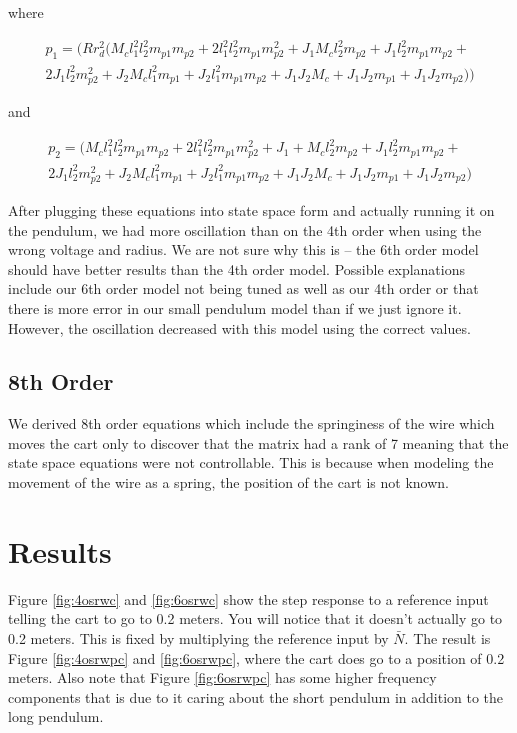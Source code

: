 \documentclass{article}
\begin{document}
where 

\begin{multline} 
\label{p1}
p_1 = (R r_d^2 (M_c l_1^2 l_2^2 m_{p1} m_{p2}+2 l_1^2 l_2^2 m_{p1} m_{p2}^2+J_1 M_c l_2^2 m_{p2}+J_1 l_2^2 m_{p1} m_{p2}+\\2 J_1 l_2^2 m_{p2}^2+J_2 M_c l_1^2 m_{p1}+J_2 l_1^2 m_{p1} m_{p2}+J_1 J_2 M_c+J_1 J_2 m_{p1}+J_1 J_2 m_{p2}))
\end{multline}

and 

\begin{multline*} 
\label{p2}
 p_2 = (M_c l_1^2 l_2^2 m_{p1}m_{p2}+2 l_1^2 l_2^2 m_{p1} m_{p2}^2+J_1+M_c l_2^2 m_{p2}+J_1 l_2^2 m_{p1} m_{p2}+\\2 J_1 l_2^2 m_{p2}^2+J_2 M_c l_1^2 m_{p1}+J_2 l_1^2 m_{p1} m_{p2}+J_1 J_2 M_c+J_1 J_2 m_{p1}+J_1 J_2 m_{p2})
\end{multline*}

After plugging these equations into state space form and actually running it on the pendulum, we had more oscillation than on the 4th order when using the wrong voltage and radius. We are not sure why this is -- the 6th order model should have better results than the 4th order model. Possible explanations include our 6th order model not being tuned as well as our 4th order or that there is more error in our small pendulum model than if we just ignore it. However, the oscillation decreased with this model using the correct values.

\subsection{8th Order}
We derived 8th order equations which include the springiness of the wire which moves the cart only to discover that the matrix had a rank of 7 meaning that the state space equations were not controllable. This is because when modeling the movement of the wire as a spring, the position of the cart is not known. 

\section{Results}

Figure \ref{fig:4osrwc} and \ref{fig:6osrwc} show the step response to a reference input telling the cart to go to 0.2 meters. You will notice that it doesn't actually go to 0.2 meters. This is fixed by multiplying the reference input by $\bar{N}$. The result is Figure \ref{fig:4osrwpc} and \ref{fig:6osrwpc}, where the cart does go to a position of 0.2 meters. Also note that Figure \ref{fig:6osrwpc} has some higher frequency components that is due to it caring about the short pendulum in addition to the long pendulum.
\end{document}
